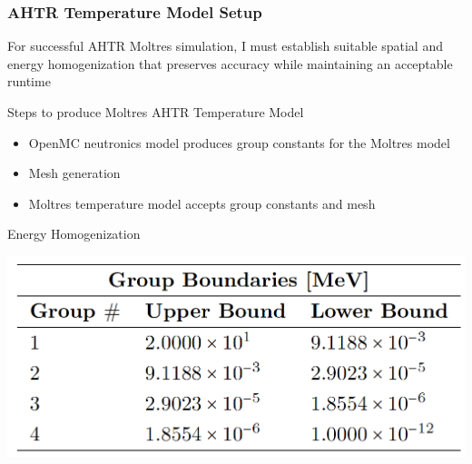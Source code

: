 \begin{frame}
    \frametitle{AHTR Temperature Model Setup}
    For successful AHTR Moltres simulation, I must establish suitable spatial and
    energy homogenization that preserves accuracy while maintaining an acceptable
    runtime
    \begin{block}{Steps to produce Moltres AHTR Temperature Model}
        \begin{itemize}
          \item OpenMC neutronics model produces group constants for the Moltres model
          \item Mesh generation
          \item Moltres temperature model accepts group constants and mesh
        \end{itemize}
    \end{block}
    \begin{block}{Energy Homogenization}
        \begin{table}[]
            \centering
            \begin{minipage}[c]{0.6\textwidth}
                \centering
                \includegraphics[width=0.8\linewidth]{figures/ahtr-energy-discr.png}
            \end{minipage}\hfill
            \begin{minipage}[c]{0.4\textwidth}
            \caption{4-group energy structures for AHTR geometry 
            derived by \cite{gentry_development_2016}.}
        \end{minipage}
        \end{table}
    \end{block}
\end{frame}

